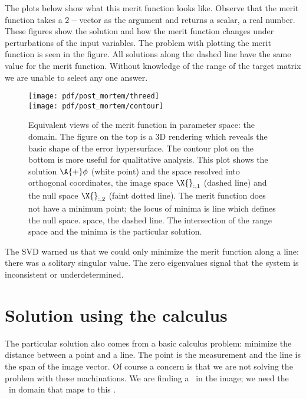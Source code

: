 The plots below show what this merit function looks like. Observe that the merit function takes a $2-$vector as the argument and returns a scalar, a real number. These figures show the solution and how the merit function changes under perturbations of the input variables. The problem with plotting the merit function is seen in the figure. All solutions along the dashed line have the same value for the merit function. Without knowledge of the range of the target matrix we are unable to select any one answer.

\begin{figure}[t] %
   \centering
   \texttt{[image: pdf/post\_mortem/threed]} \\[10pt]
   \texttt{[image: pdf/post\_mortem/contour]}
   \caption[Equivalent views of the merit function in parameter space]{Equivalent views of the merit function in parameter space: the domain. The figure on the top is a 3D rendering which reveals the basic shape of the error hypersurface. The contour plot on the bottom is more useful for qualitative analysis. This plot shows the solution $\A{+}\phi$ (white point) and the space resolved into orthogonal coordinates, the image space  $\X{}_{:,1}$ (dashed line) and the null space $\X{}_{:,2}$ (faint dotted line). The merit function does not have a minimum point; the locus of minima is line which defines the null space. space, the dashed line. The intersection of the range space and the minima is the particular solution.}
   \label{fig:2:merit}
\end{figure}
\clearpage


The SVD warned us that we could only minimize the merit function along a line: there was a solitary singular value. The zero eigenvalues signal that the system is inconsistent or underdetermined.

\section{Solution using the calculus}
The particular solution also comes from a basic calculus problem: minimize the distance between a point and a line. The point is the measurement and the line is the span of the image vector. Of course a concern is that we are not solving the problem with these machinations. We are finding a \vvv \ in the image; we need the \vv \ in domain that maps to this \vvv.

